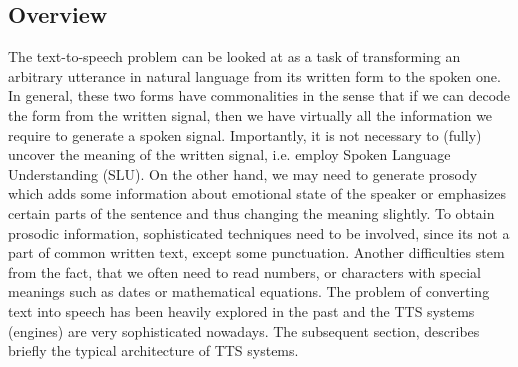 \subsection*{Overview}
\cite{taylor2009text}
The text-to-speech problem can be looked at as a task of transforming an arbitrary utterance in natural language from its written form to the spoken one.
In general, these two forms have commonalities in the sense that if we can decode the form from the written signal, then we have virtually all the information we require to generate a spoken signal.
Importantly, it is not necessary to (fully) uncover the meaning of the written signal, i.e. employ Spoken Language Understanding (SLU).
\linebreak\linebreak
On the other hand, we may need to generate prosody which adds some information about emotional state of the speaker or emphasizes certain parts of the sentence and thus changing the meaning slightly.
To obtain prosodic information, sophisticated techniques need to be involved, since its not a part of common written text, except some punctuation.
Another difficulties stem from the fact, that we often need to read numbers, or characters with special meanings such as dates or mathematical equations.
The problem of converting text into speech has been heavily explored in the past and the TTS systems (engines) are very sophisticated nowadays.
The subsequent section, describes briefly the typical architecture of TTS systems.
